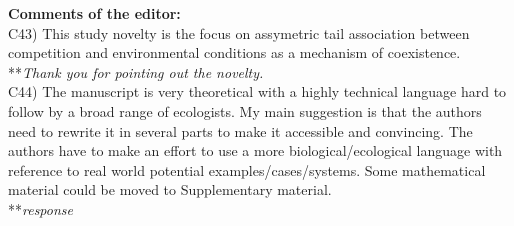 \documentclass[letterpaper,11pt]{article}
\begin{document}
\noindent \textbf{Comments of the editor:} \\

\noindent C43) This study novelty is the focus on assymetric tail association between competition and environmental conditions as a mechanism of coexistence. \\

\noindent ***\emph{Thank you for pointing out the novelty.} \\

\noindent C44) The manuscript is very theoretical with a highly technical language hard to follow by a broad range of ecologists. My main suggestion is that the authors need to rewrite it in several parts to make it accessible and convincing. The authors have to make an effort to use a more biological/ecological language with reference to real world potential examples/cases/systems. Some mathematical material could be moved to Supplementary material. \\

\noindent ***\emph{response} \\
\end{document}
